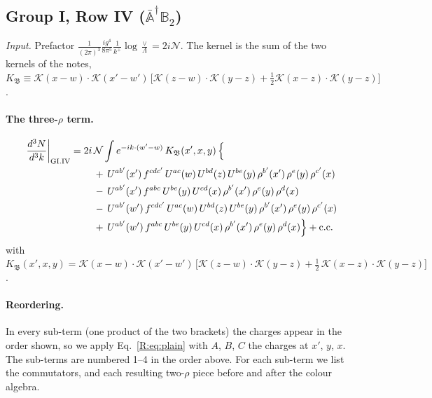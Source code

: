 \documentclass[10pt]{article}
\numberwithin{equation}{section}
\newcommand{\KK}{\mathcal K}
\newcommand{\NN}{\mathcal N}
\begin{document}
\subsection{Group I, Row IV ($\bar{\mathbb A}^\dagger\mathbb B_2$)}\label{R:sec:GI.IV}
\emph{Input.} Prefactor $\frac{1}{(2\pi)^3}\frac{ig^4}{8\pi^5}\frac1{k^+}\log\frac\vee\Lambda=2i\NN$. The kernel is the sum of the two kernels of the notes, $K_{\mathfrak B}\equiv\KK(x-w)\cdot\KK(x'-w')\,\big[\KK(z-w)\cdot\KK(y-z)+\tfrac12\KK(x-z)\cdot\KK(y-z)\big]$.
\paragraph{The three-$\rho$ term.}
\begin{align}
\frac{d^3N}{d^3k}\bigg|_{\rm GI.IV}={}&2i\,\NN\int e^{-ik\cdot(w'-w)}\,K_{\mathfrak B}(x',x,y)\,\Big\{\notag\\
&\quad +\,U^{ab'}(x')\,f^{cdc'}\,U^{ac}(w)\,U^{bd}(z)\,U^{be}(y)\,\rho^{b'}(x')\,\rho^{e}(y)\,\rho^{c'}(x)\notag\\
&\quad -\,U^{ab'}(x')\,f^{abc}\,U^{be}(y)\,U^{cd}(x)\,\rho^{b'}(x')\,\rho^{e}(y)\,\rho^{d}(x)\notag\\
&\quad -\,U^{ab'}(w')\,f^{cdc'}\,U^{ac}(w)\,U^{bd}(z)\,U^{be}(y)\,\rho^{b'}(x')\,\rho^{e}(y)\,\rho^{c'}(x)\notag\\
&\quad +\,U^{ab'}(w')\,f^{abc}\,U^{be}(y)\,U^{cd}(x)\,\rho^{b'}(x')\,\rho^{e}(y)\,\rho^{d}(x)\Big\}+{\rm c.c.}\label{R:eq:in-GI.IV}
\end{align}
with $K_{\mathfrak B}(x',x,y)=\KK(x-w)\cdot\KK(x'-w')\,\Big[\KK(z-w)\cdot\KK(y-z)+\tfrac12\,\KK(x-z)\cdot\KK(y-z)\Big]$.
\paragraph{Reordering.} In every sub-term (one product of the two brackets) the charges appear in the order shown, so we apply Eq.~\eqref{R:eq:plain} with $A$, $B$, $C$ the charges at $x'$, $y$, $x$. The sub-terms are numbered 1--4 in the order above. For each sub-term we list the commutators, and each resulting two-$\rho$ piece before and after the colour algebra.
\end{document}
